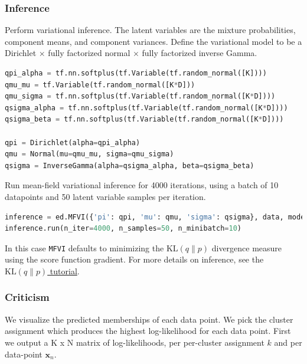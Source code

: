 \subsubsection{Inference}
Perform variational inference.
%
The latent variables are the mixture probabilities,
component means, and component variances.
Define the variational model to be a Dirichlet $\times$ fully factorized normal
$\times$ fully factorized inverse Gamma.
%
\begin{lstlisting}[language=Python]
qpi_alpha = tf.nn.softplus(tf.Variable(tf.random_normal([K])))
qmu_mu = tf.Variable(tf.random_normal([K*D]))
qmu_sigma = tf.nn.softplus(tf.Variable(tf.random_normal([K*D])))
qsigma_alpha = tf.nn.softplus(tf.Variable(tf.random_normal([K*D])))
qsigma_beta = tf.nn.softplus(tf.Variable(tf.random_normal([K*D])))

qpi = Dirichlet(alpha=qpi_alpha)
qmu = Normal(mu=qmu_mu, sigma=qmu_sigma)
qsigma = InverseGamma(alpha=qsigma_alpha, beta=qsigma_beta)
\end{lstlisting}

Run mean-field variational inference for 4000 iterations, using a batch
of 10 datapoints and 50 latent variable samples per iteration.
\begin{lstlisting}[language=Python]
inference = ed.MFVI({'pi': qpi, 'mu': qmu, 'sigma': qsigma}, data, model)
inference.run(n_iter=4000, n_samples=50, n_minibatch=10)
\end{lstlisting}
In this case
\texttt{MFVI} defaults to minimizing the
$\text{KL}(q\|p)$ divergence measure using the score function
gradient.
For more details on inference, see the \href{tut_KLqp.html}{$\text{KL}(q\|p)$ tutorial}.


\subsubsection{Criticism}

We visualize the predicted memberships of each data point.
We pick the cluster assignment which produces
the highest log-likelihood for each data point.
First we output a K x N matrix of log-likelihoods, per
per-cluster assignment $k$ and per data-point $\mathbf{x}_n$.

